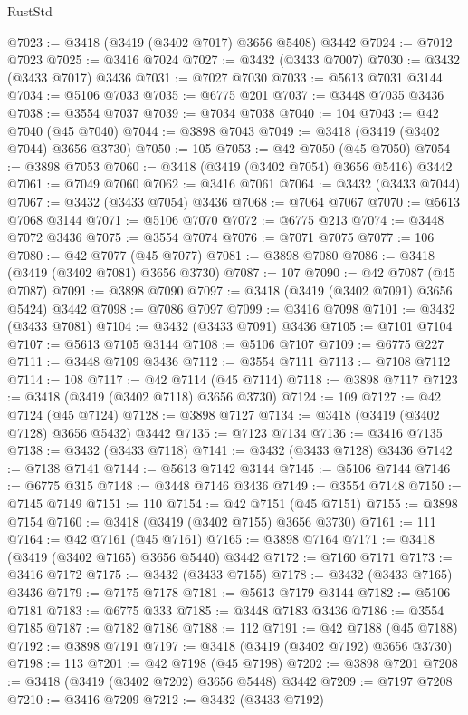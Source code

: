\begin{lexlean}{RustStd}
\begin{coremodule}
@7023 := @3418 (@3419 (@3402 @7017) @3656 @5408) @3442
@7024 := @7012 @7023
@7025 := @3416 @7024
@7027 := @3432 (@3433 @7007)
@7030 := @3432 (@3433 @7017) @3436
@7031 := @7027 @7030
@7033 := @5613 @7031 @3144
@7034 := @5106 @7033
@7035 := @6775 @201
@7037 := @3448 @7035 @3436
@7038 := @3554 @7037
@7039 := @7034 @7038
@7040 := 104
@7043 := @42 @7040 (@45 @7040)
@7044 := @3898 @7043
@7049 := @3418 (@3419 (@3402 @7044) @3656 @3730)
@7050 := 105
@7053 := @42 @7050 (@45 @7050)
@7054 := @3898 @7053
@7060 := @3418 (@3419 (@3402 @7054) @3656 @5416) @3442
@7061 := @7049 @7060
@7062 := @3416 @7061
@7064 := @3432 (@3433 @7044)
@7067 := @3432 (@3433 @7054) @3436
@7068 := @7064 @7067
@7070 := @5613 @7068 @3144
@7071 := @5106 @7070
@7072 := @6775 @213
@7074 := @3448 @7072 @3436
@7075 := @3554 @7074
@7076 := @7071 @7075
@7077 := 106
@7080 := @42 @7077 (@45 @7077)
@7081 := @3898 @7080
@7086 := @3418 (@3419 (@3402 @7081) @3656 @3730)
@7087 := 107
@7090 := @42 @7087 (@45 @7087)
@7091 := @3898 @7090
@7097 := @3418 (@3419 (@3402 @7091) @3656 @5424) @3442
@7098 := @7086 @7097
@7099 := @3416 @7098
@7101 := @3432 (@3433 @7081)
@7104 := @3432 (@3433 @7091) @3436
@7105 := @7101 @7104
@7107 := @5613 @7105 @3144
@7108 := @5106 @7107
@7109 := @6775 @227
@7111 := @3448 @7109 @3436
@7112 := @3554 @7111
@7113 := @7108 @7112
@7114 := 108
@7117 := @42 @7114 (@45 @7114)
@7118 := @3898 @7117
@7123 := @3418 (@3419 (@3402 @7118) @3656 @3730)
@7124 := 109
@7127 := @42 @7124 (@45 @7124)
@7128 := @3898 @7127
@7134 := @3418 (@3419 (@3402 @7128) @3656 @5432) @3442
@7135 := @7123 @7134
@7136 := @3416 @7135
@7138 := @3432 (@3433 @7118)
@7141 := @3432 (@3433 @7128) @3436
@7142 := @7138 @7141
@7144 := @5613 @7142 @3144
@7145 := @5106 @7144
@7146 := @6775 @315
@7148 := @3448 @7146 @3436
@7149 := @3554 @7148
@7150 := @7145 @7149
@7151 := 110
@7154 := @42 @7151 (@45 @7151)
@7155 := @3898 @7154
@7160 := @3418 (@3419 (@3402 @7155) @3656 @3730)
@7161 := 111
@7164 := @42 @7161 (@45 @7161)
@7165 := @3898 @7164
@7171 := @3418 (@3419 (@3402 @7165) @3656 @5440) @3442
@7172 := @7160 @7171
@7173 := @3416 @7172
@7175 := @3432 (@3433 @7155)
@7178 := @3432 (@3433 @7165) @3436
@7179 := @7175 @7178
@7181 := @5613 @7179 @3144
@7182 := @5106 @7181
@7183 := @6775 @333
@7185 := @3448 @7183 @3436
@7186 := @3554 @7185
@7187 := @7182 @7186
@7188 := 112
@7191 := @42 @7188 (@45 @7188)
@7192 := @3898 @7191
@7197 := @3418 (@3419 (@3402 @7192) @3656 @3730)
@7198 := 113
@7201 := @42 @7198 (@45 @7198)
@7202 := @3898 @7201
@7208 := @3418 (@3419 (@3402 @7202) @3656 @5448) @3442
@7209 := @7197 @7208
@7210 := @3416 @7209
@7212 := @3432 (@3433 @7192)

\end{coremodule}
\end{lexlean}
